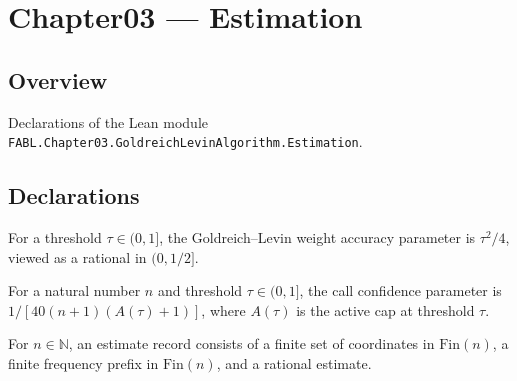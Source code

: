 \chapter{Chapter03 — Estimation}
\section{Overview}

Declarations of the Lean module \texttt{FABL.Chapter03.GoldreichLevinAlgorithm.Estimation}.

\section{Declarations}

\begin{definition}
\label{FABL.goldreichLevinWeightAccuracy}
\leanok
{}
For a threshold $\tau\in(0,1]$, the Goldreich–Levin weight accuracy parameter is
$\tau^2/4$, viewed as a rational in $(0,1/2]$.
\end{definition}

\begin{definition}
\label{FABL.goldreichLevinCallConfidence}
\leanok
{}
For a natural number $n$ and threshold $\tau\in(0,1]$, the call confidence parameter is
$1/[40(n+1)(A(\tau)+1)]$, where $A(\tau)$ is the active cap at threshold $\tau$.
\end{definition}

\begin{definition}
\label{FABL.GoldreichLevinEstimateRecord}
\leanok
For $n\in\mathbb N$, an estimate record consists of a finite set of coordinates in
$\mathrm{Fin}(n)$, a finite frequency prefix in $\mathrm{Fin}(n)$, and a rational
estimate.
\end{definition}

